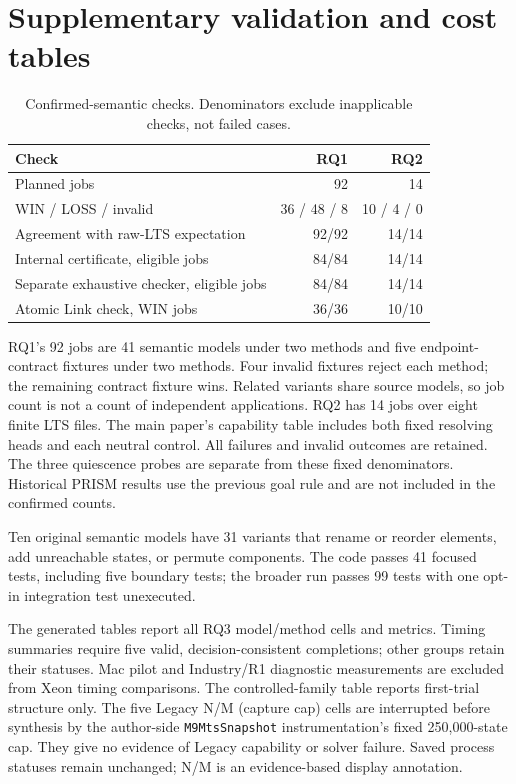 \documentclass[11pt]{article}
\begin{document}
\clearpage
\section{Supplementary validation and cost tables}
\label{supp:tables}

\par\medskip


\begin{table}[ht]
\centering\small
\caption{Confirmed-semantic checks. Denominators exclude inapplicable checks, not failed cases.}
\begin{tabular}{@{}lrr@{}}
\toprule
Check & RQ1 & RQ2\\
\midrule
Planned jobs & 92 & 14\\
WIN / LOSS / invalid & 36 / 48 / 8 & 10 / 4 / 0\\
Agreement with raw-LTS expectation & 92/92 & 14/14\\
Internal certificate, eligible jobs & 84/84 & 14/14\\
Separate exhaustive checker, eligible jobs & 84/84 & 14/14\\
Atomic Link check, WIN jobs & 36/36 & 10/10\\
\bottomrule
\end{tabular}
\end{table}
RQ1's 92 jobs are 41 semantic models under two methods and five endpoint-contract fixtures under two methods. Four invalid fixtures reject each method; the remaining contract fixture wins. Related variants share source models, so job count is not a count of independent applications. RQ2 has 14 jobs over eight finite LTS files. The main paper's capability table includes both fixed resolving heads and each neutral control. All failures and invalid outcomes are retained. The three quiescence probes are separate from these fixed denominators. Historical PRISM results use the previous goal rule and are not included in the confirmed counts.

Ten original semantic models have 31 variants that rename or reorder elements, add unreachable states, or permute components. The code passes 41 focused tests, including five boundary tests; the broader run passes 99 tests with one opt-in integration test unexecuted.

The generated tables report all RQ3 model/method cells and metrics. Timing summaries require five valid, decision-consistent completions; other groups retain their statuses. Mac pilot and Industry/R1 diagnostic measurements are excluded from Xeon timing comparisons. The controlled-family table reports first-trial structure only.
The five Legacy N/M (capture cap) cells are interrupted before synthesis by the author-side \texttt{M9MtsSnapshot} instrumentation's fixed 250,000-state cap. They give no evidence of Legacy capability or solver failure. Saved process statuses remain unchanged; N/M is an evidence-based display annotation.
\end{document}
